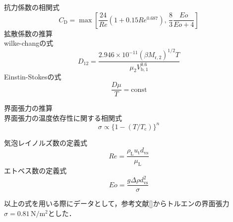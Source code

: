 抗力係数の相関式
\begin{equation}
    C_\mathrm{D} = \max \left[ \frac{24}{Re}(1+0.15Re^{0.687}), \, \frac{8}{3} \frac{Eo}{Eo+4} \right]
\end{equation}
拡散係数の推算\\
wilke-changの式
\begin{equation}
    D_{12} = \frac{2.946\times 10^{-11}(\beta M_{\mathrm{r,2}})^{1/2} T} {\mu_2 V_{\mathrm{b},1}^{0.6}}
\end{equation}
Einstin-Stokesの式
\begin{equation}
    \frac{D \mu}{T} = \text{const}
\end{equation}

界面張力の推算\\
界面張力の温度依存性に関する相関式
\begin{equation}
    \sigma \propto \{ 1-(T/T_\mathrm{c}) \}^n
\end{equation}

気泡レイノルズ数の定義式
\begin{equation}
    Re = \frac{\rho_\mathrm{L}u_\mathrm{t} d_\mathrm{vs}}{\mu_\mathrm{L}}
\end{equation}
エトベス数の定義式
\begin{equation}
    Eo = \frac{g \varDelta \rho d_\mathrm{vs}^2}{\sigma}
\end{equation}

以上の式を用いる際にデータとして，参考文献[]からトルエンの界面張力$\sigma=0.81 \,\si{\newton \per \square \metre}$とした．

